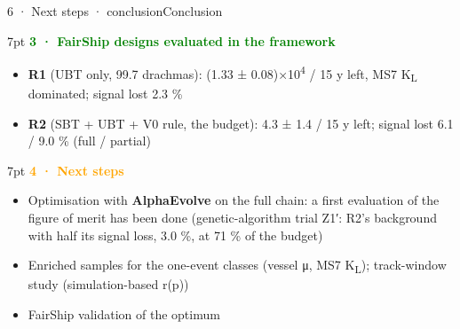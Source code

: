 \begin{btframe}{6 · Next steps · conclusion}{Conclusion}
\begin{minipage}[t]{0.49\linewidth}
\begin{mathbox}[green]{7pt}
{\fontsize{8.6pt}{10pt}\selectfont\textbf{\textcolor{green}{3 · FairShip designs evaluated in the framework}}}\par\vspace{2pt}
\begin{itemize}\setlength{\itemsep}{3pt}
  \item \textbf{R1} (UBT only, 99.7 drachmas): (1.33 ± 0.08)×10\textsuperscript{4} / 15 y left, MS7 K\textsubscript{L} dominated; signal lost 2.3 \%
  \item \textbf{R2} (SBT + UBT + V0 rule, the budget): 4.3 ± 1.4 / 15 y left; signal lost 6.1 / 9.0 \% (full / partial)
\end{itemize}
\end{mathbox}
\end{minipage}\hfill\begin{minipage}[t]{0.49\linewidth}\vspace{0pt}
\begin{mathbox}[orange]{7pt}
{\fontsize{8.6pt}{10pt}\selectfont\textbf{\textcolor{orange}{4 · Next steps}}}\par\vspace{2pt}
\begin{itemize}\setlength{\itemsep}{3pt}
  \item Optimisation with \textbf{AlphaEvolve} on the full chain: a first evaluation of the figure of merit has been done (genetic-algorithm trial Z1′: R2's background with half its signal loss, 3.0 \%, at 71 \% of the budget)
  \item Enriched samples for the one-event classes (vessel μ, MS7 K\textsubscript{L}); track-window study (simulation-based r(p))
  \item FairShip validation of the optimum
\end{itemize}
\end{mathbox}
\end{minipage}
\end{btframe}
